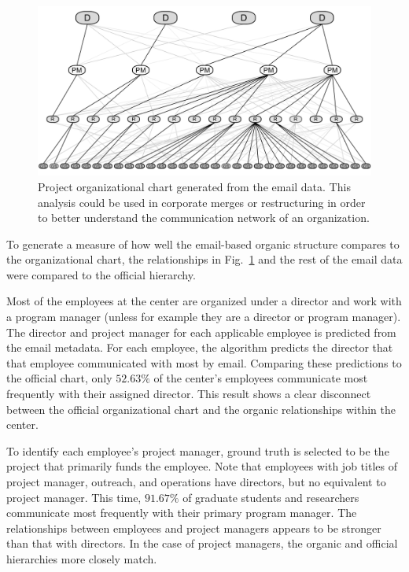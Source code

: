 \documentclass[10pt,twocolumn,conference]{IEEEtran}
\begin{document}
\begin{figure}[t]
	\centering
	\includegraphics[width=\columnwidth,trim={0mm 1mm 0mm 1mm},clip]{orgChart_3con_BW}
	\vspace{-17pt}
	\caption{Project organizational chart generated from the email data. This analysis could be used in corporate merges or restructuring in order to better understand the communication network of an organization.}
	\vspace{-18pt}
	\label{fig:org_chart}
\end{figure}

To generate a measure of how well the email-based organic structure compares to the organizational chart, the relationships in Fig.~\ref{fig:org_chart} and the rest of the email data were compared to the official hierarchy.

Most of the employees at the center are organized under a director and work with a program manager (unless for example they are a director or program manager).
The director and project manager for each applicable employee is predicted from the email metadata. 
For each employee, the algorithm predicts the director that that employee communicated with most by email.
Comparing these predictions to the official chart, only $52.63\%$ of the center's employees communicate most frequently with their assigned director.
This result shows a clear disconnect between the official organizational chart and the organic relationships within the center.

To identify each employee's project manager, ground truth is selected to be the project that primarily funds the employee.
Note that employees with job titles of project manager, outreach, and operations have directors, but no equivalent to project manager.
This time, $91.67\%$ of graduate students and researchers communicate most frequently with their primary program manager.
The relationships between employees and project managers appears to be stronger than that with directors.
In the case of project managers, the organic and official hierarchies more closely match.
\end{document}
